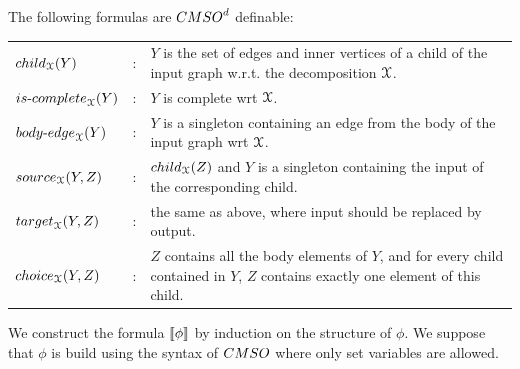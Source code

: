 \begin{proposition}
The following  formulas are  $\CMSOd$ definable:
\smallskip

\begin{tabular}{lrp{11cm}}
 $\mathsf{child}_\cX(Y)$&:&  $Y$ is the set of edges and inner vertices of a child of the input graph w.r.t. the decomposition  $\mathcal X$.\\[4pt]
 $\mathsf{is\text{-}complete}_\cX(Y)$&:&  $Y$ is complete wrt $\mathcal X$.\\[4pt]
 $\mathsf{body\text{-}edge}_\cX(Y)$&:& $Y$ is a singleton containing an edge from the body of the input graph wrt $\mathcal X$.\\[4pt]
 $\mathsf{source}_\cX(Y,Z)$&:& $\mathsf{child}_\cX(Z)$ and $Y$ is a singleton containing the input of the corresponding child. \\[4pt]
 $\mathsf{target}_\cX(Y,Z)$&: &the same as above, where input should be replaced by output.\\[4pt]
  $\mathsf{choice}_\cX(Y,Z)$&: & $Z$ contains all the body elements of $Y$, and for every child contained in $Y$, $Z$ contains exactly one element of this child.
\end{tabular}
\end{proposition}
 We construct the formula $\left\llbracket {\phi}\right\rrbracket$ by induction on the structure of $\phi$. We suppose that $\phi$ is build using the syntax of $\CMSO$ where only set variables are allowed.

